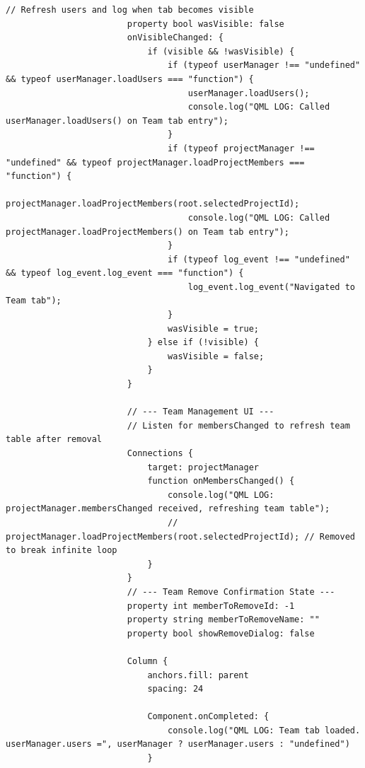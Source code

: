 \documentclass{report}
\begin{document}
\begin{lstlisting}[style=qmlstyle]
                        // Refresh users and log when tab becomes visible
                        property bool wasVisible: false
                        onVisibleChanged: {
                            if (visible && !wasVisible) {
                                if (typeof userManager !== "undefined" && typeof userManager.loadUsers === "function") {
                                    userManager.loadUsers();
                                    console.log("QML LOG: Called userManager.loadUsers() on Team tab entry");
                                }
                                if (typeof projectManager !== "undefined" && typeof projectManager.loadProjectMembers === "function") {
                                    projectManager.loadProjectMembers(root.selectedProjectId);
                                    console.log("QML LOG: Called projectManager.loadProjectMembers() on Team tab entry");
                                }
                                if (typeof log_event !== "undefined" && typeof log_event.log_event === "function") {
                                    log_event.log_event("Navigated to Team tab");
                                }
                                wasVisible = true;
                            } else if (!visible) {
                                wasVisible = false;
                            }
                        }

                        // --- Team Management UI ---
                        // Listen for membersChanged to refresh team table after removal
                        Connections {
                            target: projectManager
                            function onMembersChanged() {
                                console.log("QML LOG: projectManager.membersChanged received, refreshing team table");
                                // projectManager.loadProjectMembers(root.selectedProjectId); // Removed to break infinite loop
                            }
                        }
                        // --- Team Remove Confirmation State ---
                        property int memberToRemoveId: -1
                        property string memberToRemoveName: ""
                        property bool showRemoveDialog: false

                        Column {
                            anchors.fill: parent
                            spacing: 24

                            Component.onCompleted: {
                                console.log("QML LOG: Team tab loaded. userManager.users =", userManager ? userManager.users : "undefined")
                            }


\end{lstlisting}
\end{document}
